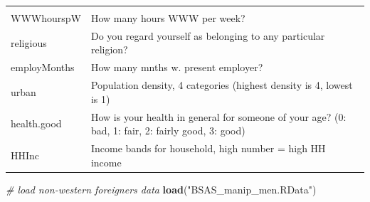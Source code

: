 \documentclass[]{article}
\newenvironment{Shaded}{\begin{snugshade}}{\end{snugshade}}
\newcommand{\CommentTok}[1]{\textcolor[rgb]{0.56,0.35,0.01}{\textit{#1}}}
\newcommand{\KeywordTok}[1]{\textcolor[rgb]{0.13,0.29,0.53}{\textbf{#1}}}
\newcommand{\NormalTok}[1]{#1}
\newcommand{\StringTok}[1]{\textcolor[rgb]{0.31,0.60,0.02}{#1}}
\begin{document}
\begin{longtable}[]{@{}ll@{}}
\begin{minipage}[t]{0.83\columnwidth}
\end{minipage}\tabularnewline
\begin{minipage}[t]{0.11\columnwidth}\raggedright
WWWhourspW\strut
\end{minipage} & \begin{minipage}[t]{0.83\columnwidth}\raggedright
How many hours WWW per week?\strut
\end{minipage}\tabularnewline
\begin{minipage}[t]{0.11\columnwidth}\raggedright
religious\strut
\end{minipage} & \begin{minipage}[t]{0.83\columnwidth}\raggedright
Do you regard yourself as belonging to any particular religion?\strut
\end{minipage}\tabularnewline
\begin{minipage}[t]{0.11\columnwidth}\raggedright
employMonths\strut
\end{minipage} & \begin{minipage}[t]{0.83\columnwidth}\raggedright
How many mnths w. present employer?\strut
\end{minipage}\tabularnewline
\begin{minipage}[t]{0.11\columnwidth}\raggedright
urban\strut
\end{minipage} & \begin{minipage}[t]{0.83\columnwidth}\raggedright
Population density, 4 categories (highest density is 4, lowest is 1)\strut
\end{minipage}\tabularnewline
\begin{minipage}[t]{0.11\columnwidth}\raggedright
health.good\strut
\end{minipage} & \begin{minipage}[t]{0.83\columnwidth}\raggedright
How is your health in general for someone of your age? (0: bad, 1: fair, 2: fairly good, 3: good)\strut
\end{minipage}\tabularnewline
\begin{minipage}[t]{0.11\columnwidth}\raggedright
HHInc\strut
\end{minipage} & \begin{minipage}[t]{0.83\columnwidth}\raggedright
Income bands for household, high number = high HH income\strut
\end{minipage}\tabularnewline
\bottomrule
\end{longtable}

\begin{Shaded}
\begin{Highlighting}[]
\CommentTok{# load non-western foreigners data}
\KeywordTok{load}\NormalTok{(}\StringTok{"BSAS_manip_men.RData"}\NormalTok{)}
\end{Highlighting}
\end{Shaded}
\end{document}
